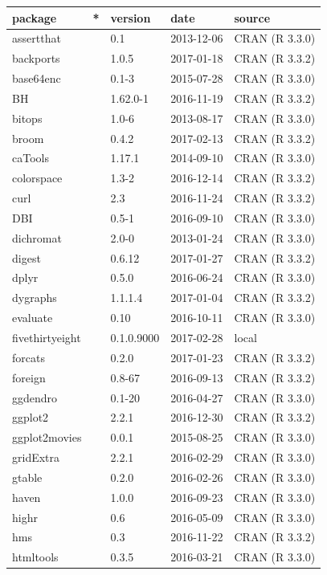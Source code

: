 \documentclass[]{tufte-book}
\begin{document}
\begin{longtable}{lllll}
\toprule
package & * & version & date & source\\
\midrule
assertthat &  & 0.1 & 2013-12-06 & CRAN (R 3.3.0)\\
backports &  & 1.0.5 & 2017-01-18 & CRAN (R 3.3.2)\\
base64enc &  & 0.1-3 & 2015-07-28 & CRAN (R 3.3.0)\\
BH &  & 1.62.0-1 & 2016-11-19 & CRAN (R 3.3.2)\\
bitops &  & 1.0-6 & 2013-08-17 & CRAN (R 3.3.0)\\
\addlinespace
broom &  & 0.4.2 & 2017-02-13 & CRAN (R 3.3.2)\\
caTools &  & 1.17.1 & 2014-09-10 & CRAN (R 3.3.0)\\
colorspace &  & 1.3-2 & 2016-12-14 & CRAN (R 3.3.2)\\
curl &  & 2.3 & 2016-11-24 & CRAN (R 3.3.2)\\
DBI &  & 0.5-1 & 2016-09-10 & CRAN (R 3.3.0)\\
\addlinespace
dichromat &  & 2.0-0 & 2013-01-24 & CRAN (R 3.3.0)\\
digest &  & 0.6.12 & 2017-01-27 & CRAN (R 3.3.2)\\
dplyr &  & 0.5.0 & 2016-06-24 & CRAN (R 3.3.0)\\
dygraphs &  & 1.1.1.4 & 2017-01-04 & CRAN (R 3.3.2)\\
evaluate &  & 0.10 & 2016-10-11 & CRAN (R 3.3.0)\\
\addlinespace
fivethirtyeight &  & 0.1.0.9000 & 2017-02-28 & local\\
forcats &  & 0.2.0 & 2017-01-23 & CRAN (R 3.3.2)\\
foreign &  & 0.8-67 & 2016-09-13 & CRAN (R 3.3.2)\\
ggdendro &  & 0.1-20 & 2016-04-27 & CRAN (R 3.3.0)\\
ggplot2 &  & 2.2.1 & 2016-12-30 & CRAN (R 3.3.2)\\
\addlinespace
ggplot2movies &  & 0.0.1 & 2015-08-25 & CRAN (R 3.3.0)\\
gridExtra &  & 2.2.1 & 2016-02-29 & CRAN (R 3.3.0)\\
gtable &  & 0.2.0 & 2016-02-26 & CRAN (R 3.3.0)\\
haven &  & 1.0.0 & 2016-09-23 & CRAN (R 3.3.0)\\
highr &  & 0.6 & 2016-05-09 & CRAN (R 3.3.0)\\
\addlinespace
hms &  & 0.3 & 2016-11-22 & CRAN (R 3.3.2)\\
htmltools &  & 0.3.5 & 2016-03-21 & CRAN (R 3.3.0)\\

\end{longtable}
\end{document}
